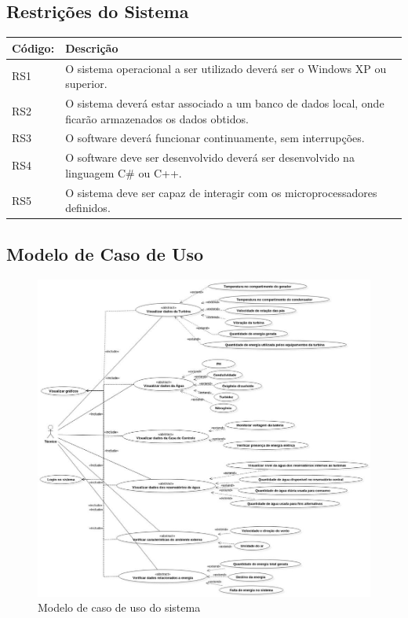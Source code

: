 \subsection*{Restrições do Sistema}
\begin{table}[!htp]
\centering
\begin{tabular}{|p{4cm}|p{10cm}|}\hline
\textbf{Código:}&\textbf{Descrição}\\ \hline
RS1	&O sistema operacional a ser utilizado deverá ser o Windows XP ou superior.\\ \hline
RS2	&O sistema deverá estar associado a um banco de dados local, onde ficarão armazenados os dados obtidos.\\ \hline
RS3	&O software deverá funcionar continuamente, sem interrupções.\\ \hline
RS4	&O software deve ser desenvolvido deverá ser desenvolvido na linguagem C\# ou C++.\\ \hline
RS5	&O sistema deve ser capaz de interagir com os microprocessadores definidos.\\ \hline
\end{tabular}
\end{table}

\subsection*{Modelo de Caso de Uso}
\FloatBarrier
\begin{figure}[!ht]
\centering
\includegraphics[scale=0.5]{figuras/modelo_caso_uso}
\caption[Modelo Caso Uso]{Modelo de caso de uso do sistema}
\label{caso_uso}
\end{figure}
\FloatBarrier
%